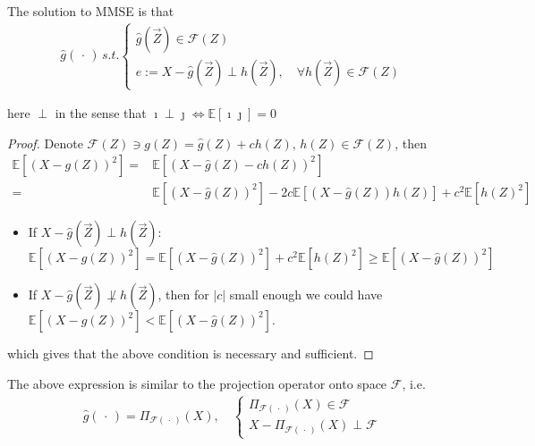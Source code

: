     The solution to MMSE is that
    \begin{align*}
         \hat{g}(\, \cdot \, )\, s.t. \begin{cases}
            \hat{g}(\vec{Z})\in \mathscr{F}(Z)\\
            e:=X-\hat{g}(\vec{Z})\perp h(\vec{Z}),\quad \forall h(\vec{Z})\in\mathscr{F}(Z)
         \end{cases}
    \end{align*}
    
    here $ \perp $ in the sense that $ \imath \perp \jmath \Leftrightarrow \mathbb{E}\left[ \imath\jmath \right]=0  $
    
    \begin{proof}
        Denote $ \mathscr{F}(Z)\ni g(Z)=\hat{g}(Z)+c h(Z)  ,\,h(Z)\in\mathscr{F}(Z)$, then
        \begin{align*}
            \mathbb{E}\left[ (X-g(Z))^2 \right]  =&\mathbb{E}\left[ (X-\hat{g}(Z)-ch(Z))^2 \right]\\
            =&\mathbb{E}\left[ (X-\hat{g}(Z))^2 \right] -2c\mathbb{E}\left[ (X-\hat{g}(Z))h(Z) \right]+c^2\mathbb{E}\left[ h(Z)^2 \right]  
        \end{align*}
        
        \begin{itemize}[topsep=2pt,itemsep=0pt]
            \item If $ X-\hat{g}(\vec{Z})\perp h(\vec{Z})  $: $
                \mathbb{E}\left[ (X-g(Z))^2 \right]  =\mathbb{E}\left[ (X-\hat{g}(Z))^2 \right] +c^2\mathbb{E}\left[ h(Z)^2 \right]  \geq \mathbb{E}\left[ (X-\hat{g}(Z))^2 \right]$
            \item If $ X-\hat{g}(\vec{Z})\not\perp h(\vec{Z})  $, then for $ |c| $ small enough we could have $ \mathbb{E}\left[ (X-g(Z))^2 \right]< \mathbb{E}\left[ (X-\hat{g}(Z))^2 \right]$.          
        \end{itemize}
        
        which gives that the above condition is  necessary and sufficient.
    \end{proof}
    
    
    
    The above expression is similar to the projection operator onto space $ \mathscr{F} $, i.e.
    \begin{align*}
        \hat{g}(\, \cdot \, )=\Pi_{\mathscr{F(\, \cdot \, )}}(X),\quad \begin{cases}
            \Pi_{\mathscr{F(\, \cdot \, )}}(X)\in \mathscr{F}\\
            X-\Pi_{\mathscr{F(\, \cdot \, )}}(X)\perp \mathscr{F}
        \end{cases}
    \end{align*}
    
